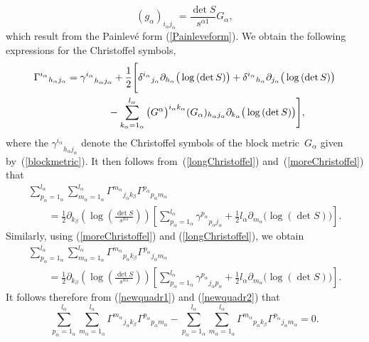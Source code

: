\documentclass[11pt]{article}
\numberwithin{equation}{section}
\newcommand{\ialpha}{i_{\alpha}}
\newcommand{\jalpha}{j_{\alpha}}
\newcommand{\kbeta}{k_{\beta}}
\newcommand{\malpha}{m_{\alpha}}
\newcommand{\lalpha}{l_{\alpha}}
\newcommand{\palpha}{p_{\alpha}}
\newcommand{\kalpha}{k_{\alpha}}
\newcommand{\halpha}{h_{\alpha}}
\begin{document}
\[
(g_{\alpha})_{\ialpha \jalpha}=\frac{\det S}{s^{\alpha 1}}G_{\alpha},
\]
which result from the Painlev\'e form (\ref{Painleveform}). We obtain the following expressions for the Christoffel symbols,
\begin{gather}
{\Gamma^{\ialpha}}_{\halpha \jalpha}={\gamma^{\ialpha}}_{\halpha \jalpha} +\frac{1}{2}\Bigg[ {\delta^{\ialpha}}_{\jalpha}\partial_{\halpha}\big(\log{(\det S)}\big)+{\delta^{\ialpha}}_{\halpha}\partial_{\jalpha}\big(\log{(\det S)}\big)\nonumber\\
\hphantom{{\Gamma^{\ialpha}}_{\halpha \jalpha}=}{}-\sum_{\kalpha = 1_{\alpha}}^{\lalpha}\big(G^{\alpha}\big)^{\ialpha \kalpha}(G_{\alpha})_{\halpha \jalpha}\partial_{\kalpha}\big(\log{(\det S)}\big)\Bigg],\label{longChristoffel}
\end{gather}
where the ${\gamma^{\ialpha}}_{\halpha \jalpha}$ denote the Christoffel symbols of the block metric~$G_{\alpha}$ given by~(\ref{blockmetric}). It then follows from~(\ref{longChristoffel}) and~(\ref{moreChristoffel}) that
\begin{gather}
\sum_{\palpha=1_{\alpha}}^{\lalpha}\sum_{\malpha = 1_{\alpha}}^{\lalpha}{\Gamma^{\malpha}}_{\jalpha \kbeta}{\Gamma^{\palpha}}_{\palpha \malpha}\nonumber\\
\qquad{} =\frac{1}{2}\partial_{\kbeta}\left(\log\left(\frac{\det S}{s^{\alpha 1}}\right)\right)\left[\sum_{\palpha=1_{\alpha}}^{\lalpha}{\gamma^{\palpha}}_{\palpha \jalpha}+\frac{1}{2}\lalpha \partial_{\malpha}\big(\log{(\det S)}\big)\right].\label{newquadr1}
\end{gather}
Similarly, using (\ref{moreChristoffel}) and (\ref{longChristoffel}), we obtain
\begin{gather}
\sum_{\palpha=1_{\alpha}}^{\lalpha}\sum_{\malpha=1_{\alpha}}^{\lalpha}{\Gamma^{\malpha}}_{\palpha \kbeta}{\Gamma^{\palpha}}_{\jalpha \malpha}\nonumber\\
\qquad{} =\frac{1}{2}\partial_{\kbeta}\left(\log\left(\frac{\det S}{s^{\alpha 1}}\right)\right)\left[\sum_{\palpha=1_{\alpha}}^{\lalpha}{\gamma^{\palpha}}_{\jalpha \palpha}+\frac{1}{2}\lalpha \partial_{\malpha}\big(\log{(\det S)}\big)\right].\label{newquadr2}
\end{gather}
It follows therefore from (\ref{newquadr1}) and (\ref{newquadr2}) that
\[
\sum_{\palpha=1_{\alpha}}^{\lalpha}\sum_{\malpha = 1_{\alpha}}^{\lalpha}{\Gamma^{\malpha}}_{\jalpha \kbeta}{\Gamma^{\palpha}}_{\palpha \malpha}-\sum_{\palpha=1_{\alpha}}^{\lalpha}\sum_{\malpha=1_{\alpha}}^{\lalpha}{\Gamma^{\malpha}}_{\palpha \kbeta}{\Gamma^{\palpha}}_{\jalpha \malpha}=0.
\]
\end{document}
